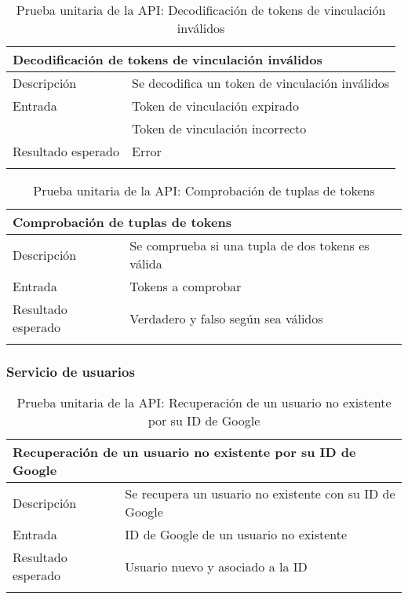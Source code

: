 \begin{longtable}{|p{} p{}|}
    \hline
    \multicolumn{2}{|l|}{\textbf{Decodificación de tokens de vinculación inválidos}} \\ \hline 
    Descripción                 & Se decodifica un token de vinculación inválidos \\ \hline
    Entrada                     & Token de vinculación expirado \\
                                & Token de vinculación incorrecto \\ \hline
    Resultado esperado          & Error \\  \hline
    \caption{Prueba unitaria de la API: Decodificación de tokens de vinculación inválidos}
    \label{cp:u:api:decodificacion_token_vinculacion_invalido}
\end{longtable}

\vspace{-20pt}
\begin{longtable}{|p{} p{}|}
    \hline
    \multicolumn{2}{|l|}{\textbf{Comprobación de tuplas de tokens}} \\ \hline 
    Descripción                 & Se comprueba si una tupla de dos tokens es válida \\ \hline
    Entrada                     & Tokens a comprobar \\ \hline
    Resultado esperado          & Verdadero y falso según sea válidos \\  \hline
    \caption{Prueba unitaria de la API: Comprobación de tuplas de tokens}
    \label{cp:u:api:comprobar_tupla_token}
\end{longtable}

\vspace{-30pt}
\subsubsection{Servicio de usuarios}

\vspace{-5pt}
\begin{longtable}{|p{} p{}|}
    \hline
    \multicolumn{2}{|l|}{\textbf{Recuperación de un usuario no existente por su ID de Google}} \\ \hline 
    Descripción                 & Se recupera un usuario no existente con su ID de Google \\ \hline
    Entrada                     & ID de Google de un usuario no existente \\ \hline
    Resultado esperado          & Usuario nuevo y asociado a la ID \\  \hline
    \caption{Prueba unitaria de la API: Recuperación de un usuario no existente por su ID de Google}
    \label{cp:u:api:recuperar_usuario_no_existente_googleid}
\end{longtable}


